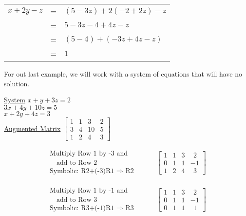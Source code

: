 \begin{center}
\begin{tabular}{ccl}
$x+2y-z$&=&$(5-3z)+2(-2+2z)-z$\\
&=&$5-3z-4+4z-z$\\
&=&$(5-4)+(-3z+4z-z)$\\
&=&$1$
\end{tabular}
\end{center}
For out last example, we will work with a system of equations that will have no solution.

\newpage

\begin{example}
\end{example}
\begin{center}
\begin{multicols}{2}
\underline{System}\pp
$x+y+3z=2$\\
$3x+4y+10z=5$\\
$x+2y+4z=3$\\
\underline{Augmented Matrix}\pp
$\left[\begin{array}{ccc|c}
1 & 1 & 3 & 2\\
3 & 4 & 10 & 5\\
1 & 2 & 4 & 3
\end{array}\right]$
\end{multicols}
\end{center}

\begin{eqnarray*}
\begin{array}{l}
\text{Multiply Row 1 by -3 and}\\
\text{~~~add to Row 2}\\
\text{Symbolic: R2+(-3)R1~}\Rightarrow \text{~R2}
\end{array}
&&
~~~~~~\left[
\begin{array}{ccc|c}
1 & 1 & 3 & ~~2\\
0 & 1 & 1 & -1\\
1 & 2 & 4 & ~~3
\end{array}
\right]
\end{eqnarray*}

\begin{eqnarray*}
\begin{array}{l}
\text{Multiply Row 1 by -1 and}\\
\text{~~~add to Row 3}\\
\text{Symbolic: R3+(-1)R1~}\Rightarrow \text{~R3}
\end{array}
&&
~~~~~~\left[
\begin{array}{ccc|c}
1 & 1 & 3 & ~~2\\
0 & 1 & 1 & -1\\
0 & 1 & 1 & ~~1
\end{array}
\right]
\end{eqnarray*}

